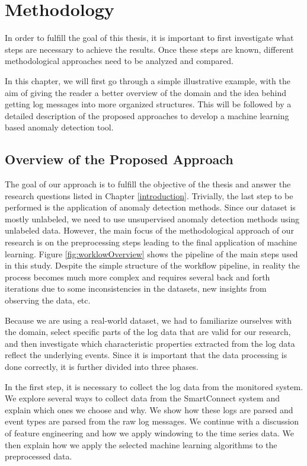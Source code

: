 \chapter{Methodology}
\label{methodology}

In order to fulfill the goal of this thesis, it is important to first investigate what steps are necessary to achieve the results. Once these steps are known, different methodological approaches need to be analyzed and compared.

In this chapter, we will first go through a simple illustrative example, with the aim of giving the reader a better overview of the domain and the idea behind getting log messages into more organized structures. This will be followed by a detailed description of the proposed approaches to develop a machine learning based anomaly detection tool.  

\section{Overview of the Proposed Approach}
The goal of our approach is to fulfill the objective of the thesis and answer the research questions listed in Chapter \ref{introduction}. Trivially, the last step to be performed is the application of anomaly detection methods. Since our dataset is mostly unlabeled, we need to use unsupervised anomaly detection methods using unlabeled data. However, the main focus of the methodological approach of our research is on the preprocessing steps leading to the final application of machine learning. Figure \ref{fig:worklowOverview} shows the pipeline of the main steps used in this study. Despite the simple structure of the workflow pipeline, in reality the process becomes much more complex and requires several back and forth iterations due to some inconsistencies in the datasets, new insights from observing the data, etc.

Because we are using a real-world dataset, we had to familiarize ourselves with the domain, select specific parts of the log data that are valid for our research, and then investigate which characteristic properties extracted from the log data reflect the underlying events. Since it is important that the data processing is done correctly, it is further divided into three phases.

In the first step, it is necessary to collect the log data from the monitored system. We explore several ways to collect data from the SmartConnect system and explain which ones we choose and why. We show how these logs are parsed and event types are parsed from the raw log messages. We continue with a discussion of feature engineering and how we apply windowing to the time series data. We then explain how we apply the selected machine learning algorithms to the preprocessed data. 

